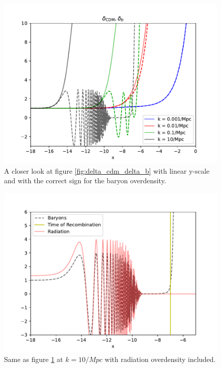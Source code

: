 \documentclass{aa}
\begin{document}
\begin{figure}[h!]
   \hspace{-1cm}   
   \includegraphics[scale=0.65]{../figures/milestone3/delta_cdm_delta_b_zoom.pdf}
   \caption{A closer look at figure \ref{fig:delta_cdm_delta_b} with linear y-scale and with the correct sign for the baryon overdensity.}\label{fig:delta_cdm_delta_b_zoom}
\end{figure}

\begin{figure}[h!]
   \includegraphics[scale=0.65]{../figures/milestone3/delta_cdm_delta_b_delta_gamma.pdf}
   \caption{Same as figure \ref{fig:delta_cdm_delta_b_zoom} at $k=10/Mpc$ with radiation overdensity included.}\label{fig:delta_cdm_delta_b_delta_gamma}
\end{figure}
\end{document}
